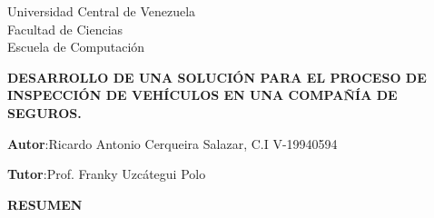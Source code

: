 
\begin{center}
	Universidad Central de Venezuela\\
	Facultad de Ciencias\\
	Escuela de Computación\\
	
\end{center}

\begin{center}
	\textbf{ DESARROLLO DE UNA SOLUCIÓN PARA EL PROCESO DE INSPECCIÓN DE VEHÍCULOS EN UNA COMPAÑÍA DE SEGUROS. }
\end{center}

\begin{flushright}
\textbf{Autor}:Ricardo Antonio Cerqueira Salazar, C.I V-19940594
\end{flushright}

\begin{flushright}
\textbf{Tutor}:Prof. Franky Uzcátegui Polo
\end{flushright}


\begin{center}
	\large{\textbf{RESUMEN}}
\end{center}

